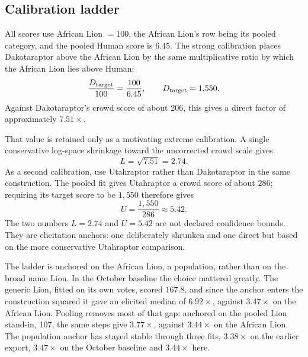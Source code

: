 \documentclass[11pt]{article}
\begin{document}
\subsection{Calibration ladder}
All scores use African Lion $=100$, the African Lion's row being its pooled category, and the pooled Human score is $6.45$. The strong calibration places Dakotaraptor above the African Lion by the same multiplicative ratio by which the African Lion lies above Human:
\[
\frac{D_{\rm target}}{100}=\frac{100}{6.45},
\qquad D_{\rm target}=1{,}550.
\]
Against Dakotaraptor's crowd score of about $206$, this gives a direct factor of approximately $7.51\times$.

That value is retained only as a motivating extreme calibration. A single conservative log-space shrinkage toward the uncorrected crowd scale gives
\[
L=\sqrt{7.51}=2.74.
\]
As a second calibration, use Utahraptor rather than Dakotaraptor in the same construction. The pooled fit gives Utahraptor a crowd score of about $286$; requiring its target score to be $1{,}550$ therefore gives
\[
U=\frac{1{,}550}{286}\approx5.42.
\]
The two numbers $L=2.74$ and $U=5.42$ are not declared confidence bounds. They are elicitation anchors: one deliberately shrunken and one direct but based on the more conservative Utahraptor comparison.

The ladder is anchored on the African Lion, a population, rather than on the broad name Lion. In the October baseline the choice mattered greatly. The generic Lion, fitted on its own votes, scored $167.8$, and since the anchor enters the construction squared it gave an elicited median of $6.92\times$, against $3.47\times$ on the African Lion. Pooling removes most of that gap: anchored on the pooled Lion stand-in, 107, the same steps give $3.77\times$, against $3.44\times$ on the African Lion. The population anchor has stayed stable through three fits, $3.38\times$ on the earlier export, $3.47\times$ on the October baseline and $3.44\times$ here.
\end{document}
